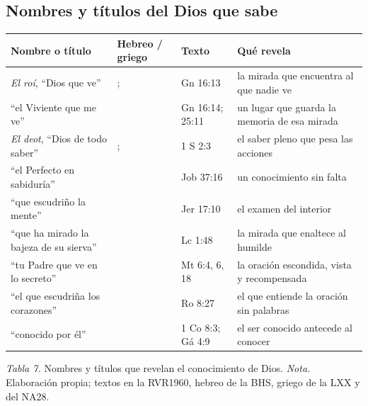 
\subsection{Nombres y títulos del Dios que sabe}

\begin{center}\small\renewcommand{\arraystretch}{1.2}
\begin{tabular}{@{}L{3.3cm}L{3.9cm}L{2.4cm}L{4.8cm}@{}}
\toprule
\textbf{Nombre o título} & \textbf{Hebreo / griego} & \textbf{Texto} & \textbf{Qué revela} \\ \midrule
\emph{El roí}, ``Dios que ve'' & ;  & Gn 16:13 & la mirada que encuentra al que nadie ve \\
``el Viviente que me ve'' &  & Gn 16:14; 25:11 & un lugar que guarda la memoria de esa mirada \\
\emph{El deot}, ``Dios de todo saber'' & ;  & 1 S 2:3 & el saber pleno que pesa las acciones \\
``el Perfecto en sabiduría'' &  & Job 37:16 & un conocimiento sin falta \\
``que escudriño la mente'' &  & Jer 17:10 & el examen del interior \\
``que ha mirado la bajeza de su sierva'' &  & Lc 1:48 & la mirada que enaltece al humilde \\
``tu Padre que ve en lo secreto'' &  & Mt 6:4, 6, 18 & la oración escondida, vista y recompensada \\
``el que escudriña los corazones'' &  & Ro 8:27 & el que entiende la oración sin palabras \\
``conocido por él'' &  & 1 Co 8:3; Gá 4:9 & el ser conocido antecede al conocer \\
\bottomrule
\end{tabular}\par
{\footnotesize\color{gris}\textit{Tabla 7.} Nombres y títulos que revelan el conocimiento de Dios. \textit{Nota.} Elaboración propia; textos en la RVR1960, hebreo de la BHS, griego de la LXX y del NA28.}
\end{center}

